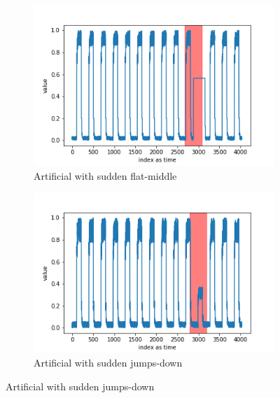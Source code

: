 \documentclass[12pt]{article}
\begin{document}
\begin{figure}[H]
  \begin{subfigure}[t]{.5\textwidth}
    \centering
    \includegraphics[width=\linewidth]{images/dataAnomalies/artificial/art_daily_flatmiddle.png}
    \caption{Artificial with sudden flat-middle}
  \end{subfigure}
  \hfill
  \begin{subfigure}[t]{.5\textwidth}
    \centering
    \includegraphics[width=\linewidth]{images/dataAnomalies/artificial/art_daily_jumpsdown.png}
    \caption{Artificial with sudden jumps-down}
  \end{subfigure}

  \medskip


\end{figure}
\end{document}
